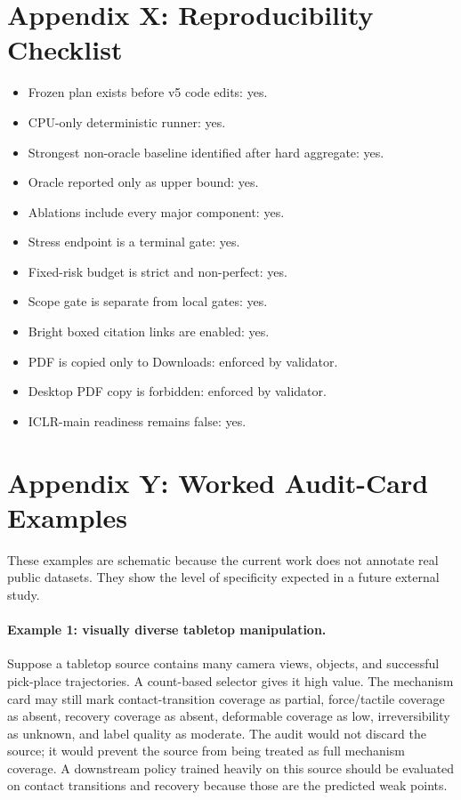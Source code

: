 \documentclass{article}
\begin{document}
\section{Appendix X: Reproducibility Checklist}
\begin{itemize}
\item Frozen plan exists before v5 code edits: yes.
\item CPU-only deterministic runner: yes.
\item Strongest non-oracle baseline identified after hard aggregate: yes.
\item Oracle reported only as upper bound: yes.
\item Ablations include every major component: yes.
\item Stress endpoint is a terminal gate: yes.
\item Fixed-risk budget is strict and non-perfect: yes.
\item Scope gate is separate from local gates: yes.
\item Bright boxed citation links are enabled: yes.
\item PDF is copied only to Downloads: enforced by validator.
\item Desktop PDF copy is forbidden: enforced by validator.
\item ICLR-main readiness remains false: yes.
\end{itemize}

\section{Appendix Y: Worked Audit-Card Examples}
These examples are schematic because the current work does not annotate real public datasets. They show the level of specificity expected in a future external study.

\paragraph{Example 1: visually diverse tabletop manipulation.}
Suppose a tabletop source contains many camera views, objects, and successful pick-place trajectories. A count-based selector gives it high value. The mechanism card may still mark contact-transition coverage as partial, force/tactile coverage as absent, recovery coverage as absent, deformable coverage as low, irreversibility as unknown, and label quality as moderate. The audit would not discard the source; it would prevent the source from being treated as full mechanism coverage. A downstream policy trained heavily on this source should be evaluated on contact transitions and recovery because those are the predicted weak points.
\end{document}
